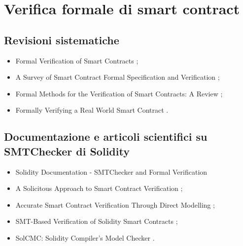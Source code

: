 \section*{Verifica formale di smart contract}

\subsection*{Revisioni sistematiche}

\begin{itemize}

\item Formal Verification of Smart Contracts \cite{ethereum2024scfvreview};

\item A Survey of Smart Contract Formal Specification and Verification \cite{tolmach2021scfvreview};

\item Formal Methods for the Verification of Smart Contracts: A Review \cite{krichen2022scfvreview};

\item Formally Verifying a Real World Smart Contract \cite{mota2023scfvreview}.

\end{itemize}

\subsection*{Documentazione e articoli scientifici su SMTChecker di Solidity}

\begin{itemize}

\item Solidity Documentation - SMTChecker and Formal Verification \cite{solidity0.8.18smtchecker}

\item A Solicitous Approach to Smart Contract Verification \cite{otoni2023smtchecker};

\item Accurate Smart Contract Verification Through Direct Modelling \cite{marescotti2020smtchecker};

\item SMT-Based Verification of Solidity Smart Contracts \cite{alt2018smtchecker};

\item SolCMC: Solidity Compiler's Model Checker \cite{alt2022smtchecker}.

\end{itemize}

